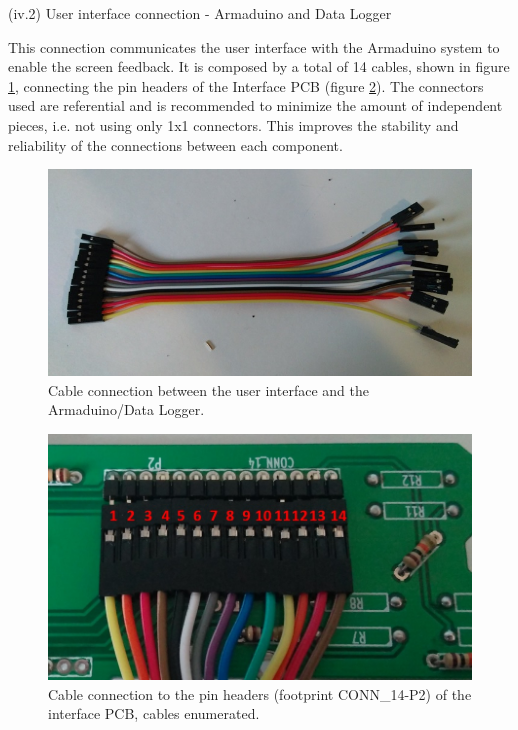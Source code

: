 \documentclass[12pt,letterpaper]{article}
\numberwithin{figure}{section}
\numberwithin{equation}{section}
\numberwithin{table}{section}
\begin{document}
\begin{flushleft}
(iv.2) User interface connection - Armaduino and Data Logger
\end{flushleft}

This connection communicates the user interface with the Armaduino system to enable the screen feedback. It is composed by a total of 14 cables, shown in figure \ref{fig:21}, connecting the pin headers of the Interface PCB (figure \ref{fig:22}). The connectors used are referential and is recommended to minimize the amount of independent pieces, i.e. not using only 1x1 connectors. This improves the stability and reliability of the connections between each component.

\begin{figure}[H]
    \centering
    \includegraphics[scale=0.5]{Figuras/figure_21.jpg}
    \caption{Cable connection between the user interface and the Armaduino/Data Logger.}
    \label{fig:21}
\end{figure}

\begin{figure}[H]
    \centering
    \includegraphics[scale=0.5]{Figuras/figure_22.jpg}
    \caption{Cable connection to the pin headers (footprint CONN\_14-P2) of the interface PCB, cables enumerated.}
    \label{fig:22}
\end{figure}
\end{document}
